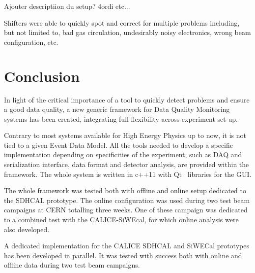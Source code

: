 \documentclass[conference]{IEEEtran}
\begin{document}
{\color{red} Ajouter descriptiion du setup? 4ordi etc...}


Shifters were able to quickly spot and correct for multiple problems including, but not limited to, bad gas circulation, undesirably noisy electronics, wrong beam configuration, etc.

\section{Conclusion}
In light of the critical importance of a tool to quickly detect problems and ensure a good data quality, a new generic framework for Data Quality Monitoring systems has been created, integrating full flexibility across experiment set-up.

Contrary to most systems available for High Energy Physics up to now, it is not tied to a given Event Data Model. All the tools needed to develop a specific implementation depending on specificities of the experiment, such as DAQ and serialization interface, data format and detector analysis, are provided within the framework.
The whole system is written in c++11 with Qt~\cite{QT} libraries for the GUI.

The whole framework was tested both with offline and online setup dedicated to the SDHCAL prototype. The online configuration was used during two test beam campaigns at CERN totalling three weeks. One of these campaign was dedicated to a combined test with the CALICE-SiWEcal, for which online analysis were also developed.


A dedicated implementation for the CALICE SDHCAL and SiWECal prototypes has been developed in parallel. It was tested with success both with online and offline data during two test beam campaigns.



%
%
\end{document}
